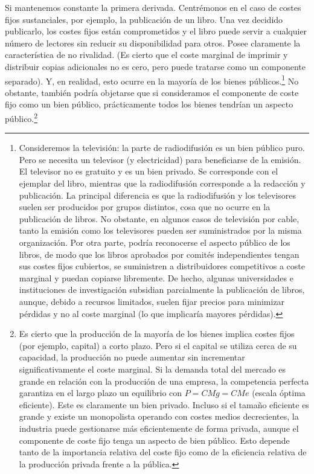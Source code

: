 \documentclass[10pt,a4paper]{article}
\begin{document}
Si mantenemos constante la primera derivada. Centrémonos en el caso de costes fijos sustanciales, por ejemplo, la publicación de un libro. Una vez decidido publicarlo, los costes fijos están comprometidos y el libro puede servir a cualquier número de lectores sin reducir su disponibilidad para otros. Posee claramente la característica de no rivalidad. (Es cierto que el coste marginal de imprimir y distribuir copias adicionales no es cero, pero puede tratarse como un componente separado). Y, en realidad, esto ocurre en la mayoría de los bienes públicos.\footnote{%
    Consideremos la televisión: la parte de radiodifusión es un bien público puro. Pero se necesita un televisor (y electricidad) para beneficiarse de la emisión. El televisor no es gratuito y es un bien privado. Se corresponde con el ejemplar del libro, mientras que la radiodifusión corresponde a la redacción y publicación. La principal diferencia es que la radiodifusión y los televisores suelen ser producidos por grupos distintos, cosa que no ocurre en la publicación de libros. No obstante, en algunos casos de televisión por cable, tanto la emisión como los televisores pueden ser suministrados por la misma organización. Por otra parte, podría reconocerse el aspecto público de los libros, de modo que los libros aprobados por comités independientes tengan sus costes fijos cubiertos, se suministren a distribuidores competitivos a coste marginal y puedan copiarse libremente. De hecho, algunas universidades e instituciones de investigación subsidian parcialmente la publicación de libros, aunque, debido a recursos limitados, suelen fijar precios para minimizar pérdidas y no al coste marginal (lo que implicaría mayores pérdidas).
} No obstante, también podría objetarse que si consideramos el componente de coste fijo como un bien público, prácticamente todos los bienes tendrían un aspecto público.\footnote{%
    Es cierto que la producción de la mayoría de los bienes implica costes fijos (por ejemplo, capital) a corto plazo. Pero si el capital se utiliza cerca de su capacidad, la producción no puede aumentar sin incrementar significativamente el coste marginal. Si la demanda total del mercado es grande en relación con la producción de una empresa, la competencia perfecta garantiza en el largo plazo un equilibrio con $P = CMg=CMe$ (escala óptima eficiente). Este es claramente un bien privado. Incluso si el tamaño eficiente es grande y existe un monopolista operando con costes medios decrecientes, la industria puede gestionarse más eficientemente de forma privada, aunque el componente de coste fijo tenga un aspecto de bien público. Esto depende tanto de la importancia relativa del coste fijo como de la eficiencia relativa de la producción privada frente a la pública.
}
\end{document}
